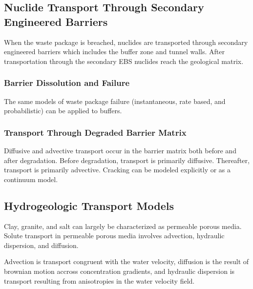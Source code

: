 
\subsection{Nuclide Transport Through Secondary Engineered Barriers}

When the waste package is breached, nuclides are transported through secondary 
engineered barriers which includes the buffer zone and tunnel walls. After 
transportation through the secondary EBS nuclides reach the geological matrix. 

\subsubsection{Barrier Dissolution and Failure}

The same models of waste package failure (instantaneous, rate based, and 
probabilistic) can be applied to buffers.

\subsubsection{Transport Through Degraded Barrier Matrix}

Diffusive and advective transport occur in the barrier matrix both before and 
after degradation. Before degradation, transport is primarily diffusive. 
Thereafter, transport is primarily advective. Cracking can be modeled explicitly 
or as a continuum model.  


\subsection{Hydrogeologic Transport Models}
Clay, granite, and salt can largely be characterized as permeable porous media. 
Solute transport in permeable porous media involves advection, hydraulic 
dispersion, and diffusion. 

Advection is transport congruent with the water velocity, diffusion is the 
result of brownian motion accross concentration gradients, and hydraulic 
dispersion is transport resulting from anisotropies in the water velocity field. 






